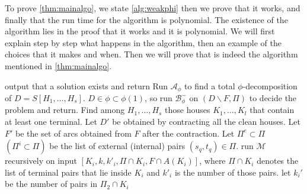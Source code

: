 To prove \autoref{thm:mainalgo}, we state \autoref{alg:weakphi} then we prove that it works, and finally that the run time for the algorithm is polynomial. 
The existence of the algorithm lies in the proof that it works and it is polynomial. 
We will first explain step by step what happens in the algorithm, then an example of the choices that it makes and when. 
Then we will prove that is indeed the algorithm mentioned in \autoref{thm:mainalgo}.
\begin{algorithm}   
    \begin{algorithmic}[1]
        \IF{$\Pi=\emptyset$}
            \STATE output that a solution exists and return
        \ENDIF
        \STATE Run $\mathcal{A}_{\phi}$ to find a total $\phi$-decomposition of $D=S[H_1,\dots,H_s]$.
            \STATE $D\in \phi\subset \phi(1)$, so run $\mathcal{B}^-_{\phi}$ on $(D\backslash F,\Pi)$ to decide the problem and return.
        \ENDIF
        \STATE Find among $H_1,\dots, H_s$ those houses $K_1,\dots , K_l$ that contain at least one terminal. 
        Let $D'$ be obtained by contracting all the clean houses. 
        Let $F'$ be the set of arcs obtained from $F$ after the contraction.
        \STATE Let $\Pi^e\subset \Pi$ $(\Pi^i\subset \Pi)$ be the list of external (internal) pairs $(s_q,t_q)\in \Pi$.
             \label{state:6a}
                \STATE run $\mathcal{M}$ recursively on input $[K_i, k, k'_i,\Pi \cap K_i, F\cap A(K_i)]$, where $\Pi \cap K_i$ denotes the list of terminal pairs that lie inside $K_i$ and $k'_i$ is the number of those pairs.
            \ENDIF
             \label{state:6b}
                \STATE let $k_i'$ be the number of pairs in $\Pi _2\cap K_i$
\end{algorithmic}
\end{algorithm}
